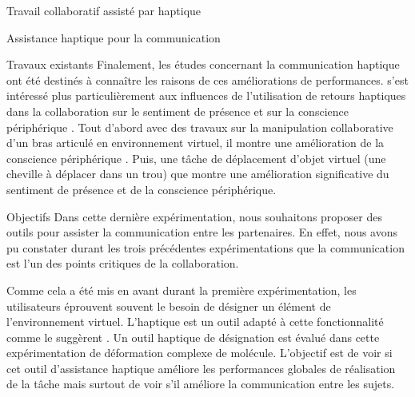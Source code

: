 \documentclass[myfrancais,ngerman,english,frenchb]{mythesis}
\begin{document}
\begin{mychapter}{Travail collaboratif assisté par haptique}
\begin{mysection}{Assistance haptique pour la communication}
\begin{mysubsection}{Travaux existants}
				Finalement, les études concernant la communication haptique ont été destinés à connaître les raisons de ces améliorations de performances.
				 s'est intéressé plus particulièrement aux influences de l'utilisation de retours haptiques dans la collaboration sur le sentiment de présence et sur la conscience périphérique .
				Tout d'abord avec des travaux sur la manipulation collaborative d'un bras articulé en environnement virtuel, il montre une amélioration de la conscience périphérique .
				Puis, une tâche de déplacement d'objet virtuel (une cheville à déplacer dans un trou) que  montre une amélioration significative du sentiment de présence et de la conscience périphérique.
			\end{mysubsection}
			\begin{mysubsection}{Objectifs}
				Dans cette dernière expérimentation, nous souhaitons proposer des outils pour assister la communication entre les partenaires.
				En effet, nous avons pu constater durant les trois précédentes expérimentations que la communication est l'un des points critiques de la collaboration.

				Comme cela a été mis en avant durant la première expérimentation, les utilisateurs éprouvent souvent le besoin de désigner un élément de l'environnement virtuel.
				L'haptique est un outil adapté à cette fonctionnalité comme le suggèrent .
				Un outil haptique de désignation est évalué dans cette expérimentation de déformation complexe de molécule.
				L'objectif est de voir si cet outil d'assistance haptique améliore les performances globales de réalisation de la tâche mais surtout de voir s'il améliore la communication entre les sujets.


\end{mysubsection}
\end{mysection}
\end{mychapter}
\end{document}
